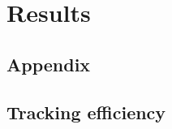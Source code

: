 \documentclass[12pt,a4paper]{report}
\begin{document}
\chapter{Results}
\begin{appendices}
\chapter{Appendix}
\section{Tracking efficiency}
\label{TrkEffApp}
\end{appendices}



\end{document}
